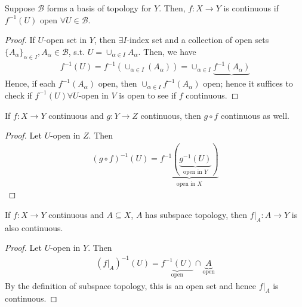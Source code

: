 \begin{proposition}
    Suppose $\mathcal{B}$ forms a basis of topology for $Y$. Then, $f: X \to Y$ is continuous if $f^{-1}(U)$ open $\forall U \in \mathcal{B}$.
\end{proposition}

\begin{proof}
    If $U$-open set in $Y$, then $\exists I$-index set and a collection of open sets $\{A_\alpha\}_{\alpha \in I}, A_\alpha \in \mathcal{B}$, s.t. $U = \cup_{\alpha \in I}A_\alpha$. Then, we have \begin{align*}
        f^{-1}(U) = f^{-1}(\cup_{\alpha \in I}(A_\alpha)) = \cup_{\alpha \in I}\underbrace{f^{-1}(A_\alpha)}
    \end{align*}
    Hence, if each $f^{-1}(A_{\alpha})$ open, then $\cup_{\alpha \in I} f^{-1}(A_{\alpha})$ open; hence it suffices to check if $f^{-1}(U) \forall U$-open in $V$ is open to see if $f$ continuous.
\end{proof}

\begin{theorem}
    If $f: X \to Y$ continuous and $g : Y \to Z$ continuous, then $g \circ f$ continuous as well.
\end{theorem}

\begin{proof}
    Let $U$-open in $Z$. Then \begin{align*}
        (g \circ f)^{-1}(U) = \underbrace{f^{-1}(\underbrace{g^{-1}(U)}_{\text{open in }Y})}_{\text{open in }X}
    \end{align*}
\end{proof}

\begin{proposition}
    If $f: X \to Y$ continuous and $A \subseteq X$, $A$ has subspace topology, then $f|_A : A \to Y$ is also continuous.\footnotemark
\end{proposition}


\begin{proof}
    Let $U$-open in $Y$. Then \begin{align*}
        (f|_A)^{-1}(U) = \underbrace{f^{-1}(U)}_{\text{open}}\cap \underbrace{A}_{\text{open}}
    \end{align*}
    By the definition of subspace topology, this is an open set and hence $f|_A$ is continuous.
\end{proof}

